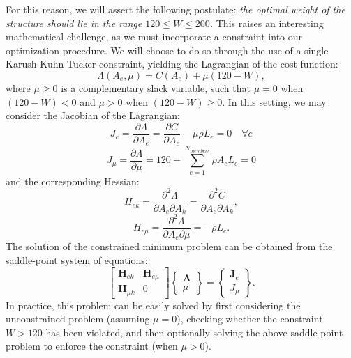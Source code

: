 \documentclass[12pt,a4paper,article]{memoir} %
\begin{document}
For this reason, we will assert the following postulate: \textit{the optimal weight of the structure should lie in the range $120 \leq W \leq 200$.} This raises an interesting mathematical challenge, as we must incorporate a constraint into our optimization procedure. We will choose to do so through the use of a single Karush-Kuhn-Tucker constraint, yielding the Lagrangian of the cost function:
\begin{equation}
	\Lambda(A_e, \mu) = C(A_e) + \mu (120 - W),
\end{equation}
where $\mu \geq 0$ is a complementary slack variable, such that $\mu = 0$ when $(120 - W) < 0$ and $\mu > 0$ when $(120 - W) \geq 0$. In this setting, we may consider the Jacobian of the Lagrangian:
\begin{equation}
	J_e = \frac{\partial \Lambda}{\partial A_e} = \frac{\partial C}{\partial A_e} - \mu \rho L_e = 0 \quad \forall e
\end{equation}
\begin{equation}
	J_\mu = \frac{\partial \Lambda}{\partial \mu} = 120 - \sum_{e = 1}^{N_{members}} \rho A_e L_e = 0
\end{equation}
and the corresponding Hessian:
\begin{equation}
	H_{ek} = \frac{\partial^2 \Lambda}{\partial A_e \partial A_k} = \frac{\partial^2 C}{\partial A_e \partial A_k},
\end{equation}
\begin{equation}
	H_{e\mu} = \frac{\partial^2 \Lambda}{\partial A_e \partial \mu} = - \rho L_e.
\end{equation}
The solution of the constrained minimum problem can be obtained from the saddle-point system of equations:
\setlength\arraycolsep{2pt}
\begin{equation}
	\left[ \begin{array}{cc} \mathbf{H}_{ek} & \mathbf{H}_{e\mu} \\ \mathbf{H}_{\mu k} & 0 \end{array} \right] \left\{ \begin{array}{c} \mathbf{A} \\ \mu \end{array} \right\} = \left\{ \begin{array}{c} \mathbf{J}_e \\ J_\mu \end{array} \right\}.
\end{equation}
In practice, this problem can be easily solved by first considering the unconstrained problem (assuming $\mu = 0$), checking whether the constraint $W > 120$ has been violated, and then optionally solving the above saddle-point problem to enforce the constraint (when $\mu > 0$).
\end{document}
